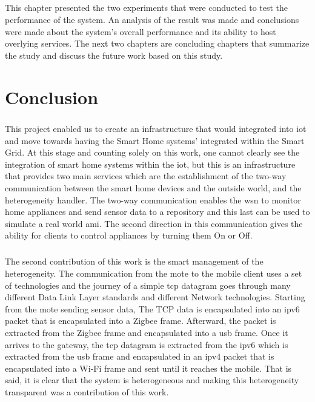 \documentclass[12pt,a4paper,final]{report}
\begin{document}
\section*{}
\paragraph{}
This chapter presented the two experiments that were conducted to test the performance of the system. An analysis of the result was made and conclusions were made about the system's overall performance and its ability to host overlying services. The next two chapters are concluding chapters that summarize the study and discuss the future work based on this study.
\chapter{Conclusion}
\paragraph{}
This project enabled us to create an infrastructure that would integrated into \gls{iot} and move towards having the Smart Home systems' integrated within the Smart Grid. At this stage and counting solely on this work, one cannot clearly see the integration of smart home systems within the \gls{iot}, but this is an infrastructure that provides two main services which are the establishment of the two-way communication between the smart home devices and the outside world, and the heterogeneity handler. The two-way communication enables the \gls{wsn} to monitor home appliances and send sensor data to a repository and this last can be used to simulate a real world \gls{ami}. The second direction in this communication gives the ability for clients to control appliances by turning them On or Off.
\paragraph{}
The second contribution of this work is the smart management of the heterogeneity. The communication from the mote to the mobile client uses a set of technologies and the journey of a simple \gls{tcp} datagram goes through many different Data Link Layer standards and different Network technologies. Starting from the mote sending sensor data, The TCP data is encapsulated into an \gls{ipv6} packet that is encapsulated into a Zigbee frame. Afterward, the packet is extracted from the Zigbee frame and encapsulated into a \gls{usb} frame. Once it arrives to the gateway, the \gls{tcp} datagram is extracted from the \gls{ipv6} which is extracted from the \gls{usb} frame and encapsulated in an \gls{ipv4} packet that is encapsulated into a Wi-Fi frame and sent until it reaches the mobile. That is said, it is clear that the system is heterogeneous and making this heterogeneity transparent was a contribution of this work.
\end{document}
